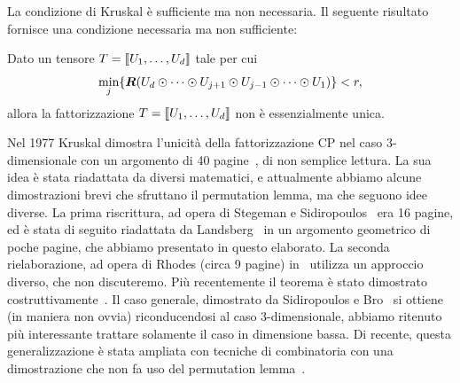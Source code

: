 La condizione di Kruskal è sufficiente ma non necessaria. Il seguente risultato fornisce una
condizione necessaria ma non sufficiente:

\begin{theorem}
	Dato un tensore $ T = \dsqr{U_1, \ldots, U_d}$ tale per cui  \[
		\min_j \left\{ \rk(U_d \krp
		\cdots \krp U_{j+1} \krp U_{j-1} \krp \cdots \krp U_1) \right\} < r
		,\] allora la fattorizzazione $ T =
		\dsqr{U_1, \ldots, U_d} $ non è essenzialmente unica.
\end{theorem}

\begin{remark}
	Nel 1977 Kruskal dimostra l'unicità della fattorizzazione CP nel caso $ 3 $-dimensionale con un
	argomento di 40 pagine~\cite{KRUSKAL197795}, di non semplice lettura.
	La sua idea è stata riadattata da diversi matematici, e attualmente abbiamo
	alcune dimostrazioni brevi che sfruttano il permutation lemma, ma che seguono idee diverse. La prima riscrittura, ad opera di Stegeman e
	Sidiropoulos~\cite{STEGEMAN2007540} era 16 pagine, ed è stata di seguito riadattata da
	Landsberg~\cite{landsberg2011tensors} in un argomento geometrico di poche pagine, che abbiamo
	presentato in questo elaborato. La seconda rielaborazione, ad opera di Rhodes (circa 9
	pagine) in~\cite{rhodes2009conciseproofkruskalstheorem} utilizza un approccio diverso, che non
	discuteremo. Più recentemente il teorema è stato dimostrato
	costruttivamente~\cite{bhargava2026algorithmic}. Il caso generale, dimostrato
	da Sidiropoulos e Bro~\cite{sidiropoulos2000uniqueness} si ottiene (in maniera non ovvia)
	riconducendosi al caso $ 3$-dimensionale, abbiamo ritenuto più interessante trattare solamente il
	caso in dimensione bassa. Di recente, questa generalizzazione è stata ampliata con tecniche di
	combinatoria con una dimostrazione che non fa uso del permutation lemma~\cite{Lovitz_2023}.
\end{remark}
